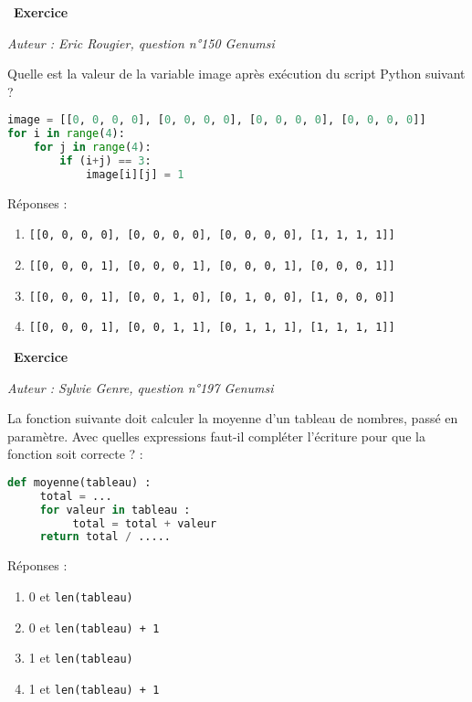 \documentclass[
  11pt,
]{article}
\newcommand{\passthrough}[1]{#1}
\providecommand{\tightlist}{%
  \setlength{\itemsep}{0pt}\setlength{\parskip}{0pt}}
\newcounter{exo}
\newenvironment{exercice}[1]
{\par \medskip   \addtocounter{exo}{1} \noindent  
\begin{bclogo}[arrondi =0.1,   noborder = true, logo=\bccrayon, marge=4]{~\textbf{Exercice} \textbf{\theexo} {\itshape #1} }  \par}
{
\end{bclogo}
 \par \bigskip }
\newcounter{def}
\begin{document}
\begin{exercice}{}

\emph{Auteur : Eric Rougier, question n°150 Genumsi}

Quelle est la valeur de la variable image après exécution du script
Python suivant ?

\begin{lstlisting}[language=Python]
image = [[0, 0, 0, 0], [0, 0, 0, 0], [0, 0, 0, 0], [0, 0, 0, 0]]
for i in range(4):
    for j in range(4):
        if (i+j) == 3:
            image[i][j] = 1
\end{lstlisting}

Réponses :

\begin{enumerate}
\def\labelenumi{\arabic{enumi}.}
\item
  \passthrough{\lstinline![[0, 0, 0, 0], [0, 0, 0, 0], [0, 0, 0, 0], [1, 1, 1, 1]]!}
\item
  \passthrough{\lstinline![[0, 0, 0, 1], [0, 0, 0, 1], [0, 0, 0, 1], [0, 0, 0, 1]]!}
\item
  \passthrough{\lstinline![[0, 0, 0, 1], [0, 0, 1, 0], [0, 1, 0, 0], [1, 0, 0, 0]]!}
\item
  \passthrough{\lstinline![[0, 0, 0, 1], [0, 0, 1, 1], [0, 1, 1, 1], [1, 1, 1, 1]]!}
\end{enumerate}

\end{exercice}

\begin{exercice}{}

\emph{Auteur : Sylvie Genre, question n°197 Genumsi}

La fonction suivante doit calculer la moyenne d'un tableau de nombres,
passé en paramètre. Avec quelles expressions faut-il compléter
l'écriture pour que la fonction soit correcte ? :

\begin{lstlisting}[language=Python]
def moyenne(tableau) :
     total = ...
     for valeur in tableau :
          total = total + valeur
     return total / .....
\end{lstlisting}

Réponses :

\begin{enumerate}
\def\labelenumi{\arabic{enumi}.}
\tightlist
\item
  0 et \passthrough{\lstinline!len(tableau)!}
\item
  0 et \passthrough{\lstinline!len(tableau) + 1!}
\item
  1 et \passthrough{\lstinline!len(tableau)!}
\item
  1 et \passthrough{\lstinline!len(tableau) + 1!}
\end{enumerate}

\end{exercice}
\end{document}
